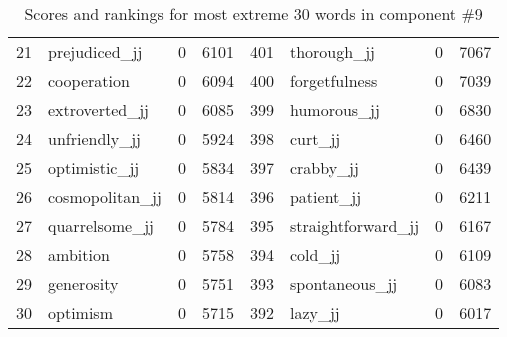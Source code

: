 \begin{table}[tbp]
\begin{tabular}{| rlr@{.}l | rlr@{.}l |}
    21 & prejudiced\_jj & 0 & 6101    &    401 & thorough\_jj & 0 & 7067 \\
    22 & cooperation & 0 & 6094    &    400 & forgetfulness & 0 & 7039 \\
    23 & extroverted\_jj & 0 & 6085    &    399 & humorous\_jj & 0 & 6830 \\
    24 & unfriendly\_jj & 0 & 5924    &    398 & curt\_jj & 0 & 6460 \\
    25 & optimistic\_jj & 0 & 5834    &    397 & crabby\_jj & 0 & 6439 \\
    26 & cosmopolitan\_jj & 0 & 5814    &    396 & patient\_jj & 0 & 6211 \\
    27 & quarrelsome\_jj & 0 & 5784    &    395 & straightforward\_jj & 0 & 6167 \\
    28 & ambition & 0 & 5758    &    394 & cold\_jj & 0 & 6109 \\
    29 & generosity & 0 & 5751    &    393 & spontaneous\_jj & 0 & 6083 \\
    30 & optimism & 0 & 5715    &    392 & lazy\_jj & 0 & 6017 \\
    \hline
    \end{tabular}
    \caption{Scores and rankings for most extreme 30 words in component \#9} 
\end{table}
\clearpage

